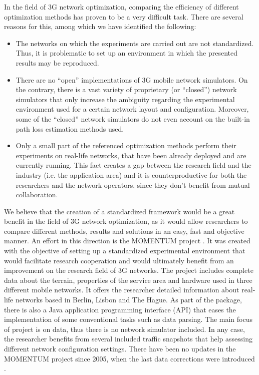 In the field of 3G network optimization, comparing the efficiency
of different optimization methods has proven to be a very difficult
task. There are several reasons for this, among which we have identified
the following:
\begin{itemize}
\item The networks on which the experiments are carried out are not standardized.
Thus, it is problematic to set up an environment in which the presented
results may be reproduced.
\item There are no ``open'' implementations of 3G mobile network simulators.
On the contrary, there is a vast variety of proprietary (or ``closed'')
network simulators that only increase the ambiguity regarding the
experimental environment used for a certain network layout and configuration.
Moreover, some of the ``closed'' network simulators do not even
account on the built-in path loss estimation methods used.
\item Only a small part of the referenced optimization methods perform their
experiments on real-life networks, that have been already deployed
and are currently running. This fact creates a gap between the research
field and the industry (i.e. the application area) and it is counterproductive
for both the researchers and the network operators, since they don't
benefit from mutual collaboration.
\end{itemize}
We believe that the creation of a standardized framework would be
a great benefit in the field of 3G network optimization, as it would
allow researchers to compare different methods, results and solutions
in an easy, fast and objective manner. An effort in this direction
is the MOMENTUM project \cite{Momentum.project}. It was created with
the objective of setting up a standardized experimental environment
that would facilitate research cooperation and would ultimately benefit
from an improvement on the research field of 3G networks. The project
includes complete data about the terrain, properties of the service
area and hardware used in three different mobile networks. It offers
the researcher detailed information about real-life networks based
in Berlin, Lisbon and The Hague. As part of the package, there is
also a Java application programming interface (API) that eases the
implementation of some conventional tasks such as data parsing. The
main focus of project is on data, thus there is no network simulator
included. In any case, the researcher benefits from several included
traffic snapshots that help assessing different network configuration
settings. There have been no updates in the MOMENTUM project since
2005, when the last data corrections were introduced \cite{Momentum.project}.


